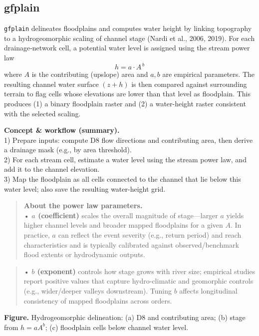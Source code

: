 \documentclass[
]{book}
\begin{document}
\subsection{gfplain}\label{gfplain}

\texttt{gfplain} delineates floodplains and computes water height by linking topography to a hydrogeomorphic scaling of channel stage (Nardi et al., 2006, 2019). For each drainage‐network cell, a potential water level is assigned using the stream power law\\
\[
h = a \cdot A^{\,b}
\]
where \(A\) is the contributing (upslope) area and \(a, b\) are empirical parameters. The resulting channel water surface \((z + h)\) is then compared against surrounding terrain to flag cells whose elevations are lower than that level as floodplain. This produces (1) a binary floodplain raster and (2) a water-height raster consistent with the selected scaling.

\textbf{Concept \& workflow (summary).}\\
1) Prepare inputs: compute D8 flow directions and contributing area, then derive a drainage mask (e.g., by area threshold).\\
2) For each stream cell, estimate a water level using the stream power law, and add it to the channel elevation.\\
3) Map the floodplain as all cells connected to the channel that lie below this water level; also save the resulting water-height grid.

\begin{quote}
\textbf{About the power law parameters.}\\
• \textbf{\(a\) (coefficient)} scales the overall magnitude of stage---larger \(a\) yields higher channel levels and broader mapped floodplains for a given \(A\). In practice, \(a\) can reflect the event severity (e.g., return period) and reach characteristics and is typically calibrated against observed/benchmark flood extents or hydrodynamic outputs.
\end{quote}

\begin{quote}
• \textbf{\(b\) (exponent)} controls how stage grows with river size; empirical studies report positive values that capture hydro-climatic and geomorphic controls (e.g., wider/deeper valleys downstream). Tuning \(b\) affects longitudinal consistency of mapped floodplains across orders.
\end{quote}

\textbf{Figure.} Hydrogeomorphic delineation: (a) D8 and contributing area; (b) stage from \(h=aA^b\); (c) floodplain cells below channel water level.
\end{document}
